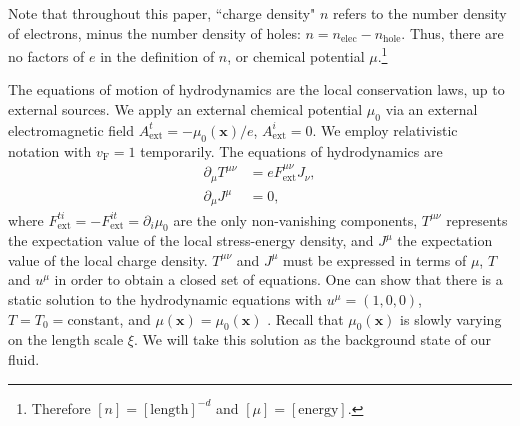 Note that throughout this paper, ``charge density" $n$ refers to the number density of electrons, minus the number density of holes:  $n=n_{\mathrm{elec}} - n_{\mathrm{hole}}$.   Thus, there are no factors of $e$ in the definition of $n$, or chemical potential $\mu$.\footnote{Therefore $[n] = [\text{length}]^{-d}$ and $[\mu]=[\text{energy}]$.}

The equations of motion of hydrodynamics are the local conservation laws, up to external sources.  We apply an external chemical potential $\mu_0$ via an external electromagnetic field $A_{\mathrm{ext}}^t = -\mu_0(\mathbf{x})/e$, $A^i_{\mathrm{ext}}=0$.   We employ relativistic notation with $v_{\mathrm{F}}=1$ temporarily.  The equations of hydrodynamics are\begin{subequations}\label{eq:AL_hydroeq}\begin{align}
\partial_\mu T^{\mu\nu} &= e F^{\mu\nu}_{\mathrm{ext}} J_\nu, \\
\partial_\mu J^\mu &= 0,
\end{align}\end{subequations}where $F^{ti}_{\mathrm{ext}} = -F^{it}_{\mathrm{ext}} = \partial_i \mu_0$ are the only non-vanishing components, $T^{\mu\nu}$ represents the expectation value of the local stress-energy density,  and $J^\mu$ the expectation value of the local charge density.     $T^{\mu\nu}$ and $J^\mu$ must be expressed in terms of $\mu$, $T$ and $u^\mu$ in order to obtain a closed set of equations.   One can show that there is a static solution to the hydrodynamic equations with $u^\mu = (1,0,0)$, $T=T_0=\text{constant}$, and $\mu(\mathbf{x})=\mu_0(\mathbf{x})$ \cite{lucas_hydrodynamic_2015}.   Recall that $\mu_0(\mathbf{x})$ is slowly varying on the length scale $\xi$.  We will take this solution as the background state of our fluid.


